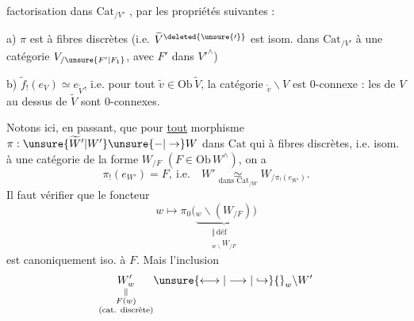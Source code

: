 
factorisation dans $\mathrm{Cat}_{/V'}$
\noindent,
par les propriétés suivantes :

a) $\pi$ est  à fibres discrètes 
(i.e. $\widetilde V^{\deleted{\unsure{\prime}}}$ est
isom. dans $\mathrm{Cat}_{/V'}$ à une catégorie $V_{/\unsure{F'|F_1}}$,
avec $F'$ dans $V'^\wedge$)

b) $\widetilde f_!(e_V)\simeq e_{\widetilde V}$, i.e. pour tout $\widetilde v\in\mathrm{Ob}\,\widetilde V$,
la catégorie $ {}_{\widetilde v}\backslash V$ est $0$-connexe : les
  de $V$ au dessus
de $\widetilde V$ sont $0$-connexes.

Notons ici, en passant, que pour \uline{tout} morphisme
$\pi:\unsure{\widetilde W'|W'}\unsure{-|\to}W$ dans $\mathrm{Cat}$ qui   à fibres
discrètes, i.e.  isom.  à une
catégorie de la forme $W_{/F}$ $(F\in\mathrm{Ob}\,W^\wedge)$,
on a
\[
 \pi_!(e_{W'})=F,\ \text{i.e.}\quad W'\underset{\text{dans }\mathrm{Cat}_{/W}}{\simeq}W_{/\pi_!(e_{W'})}.\tag*{(*)}
\]
Il faut vérifier que le foncteur
\[
 w\mapsto\pi_0\bigl(\underbrace{{}_w\backslash(W_{/F})}_{\substack{\Vert\,\text{déf}\\ {}_{w\backslash}W_{/F}}}\bigr)
\]
est canoniquement iso. à $F$. Mais l'inclusion
\[
 \underset{\substack{\Vert\\ F(w)\\ \text{(cat. discrète)}}}{W'_w}\unsure{\longleftrightarrow|\longrightarrow|\hookrightarrow}{}_{w}\backslash W'
\]

